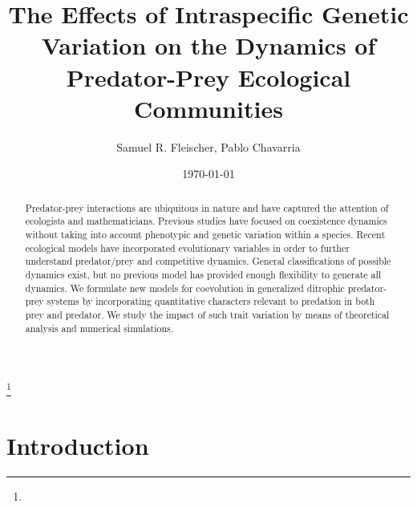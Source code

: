 \documentclass{amsart}
\theoremstyle{definition}
\theoremstyle{remark}
\numberwithin{equation}{section}
\begin{document}
\title[]{The Effects of Intraspecific Genetic Variation on the Dynamics of Predator-Prey Ecological Communities}

\author{Samuel R. Fleischer, Pablo Chavarria}
\address{Department of Mathematics, California State University, Northridge}
\curraddr{}
\thanks{}
\date{\today}






\begin{abstract}
Predator-prey interactions are ubiquitous in nature and have captured the attention of ecologists and mathematicians.  Previous studies have focused on coexistence dynamics without taking into account phenotypic and genetic variation within a species.  Recent ecological models have incorporated evolutionary variables in order to further understand predator/prey and competitive dynamics.  General classifications of possible dynamics exist, but no previous model has provided enough flexibility to generate all dynamics.  We formulate new models for coevolution in generalized ditrophic predator-prey systems by incorporating quantitative characters relevant to predation in both prey and predator.  We study the impact of such trait variation by means of theoretical analysis and numerical simulations.
\end{abstract}

\maketitle
\section{Introduction}
\end{document}
